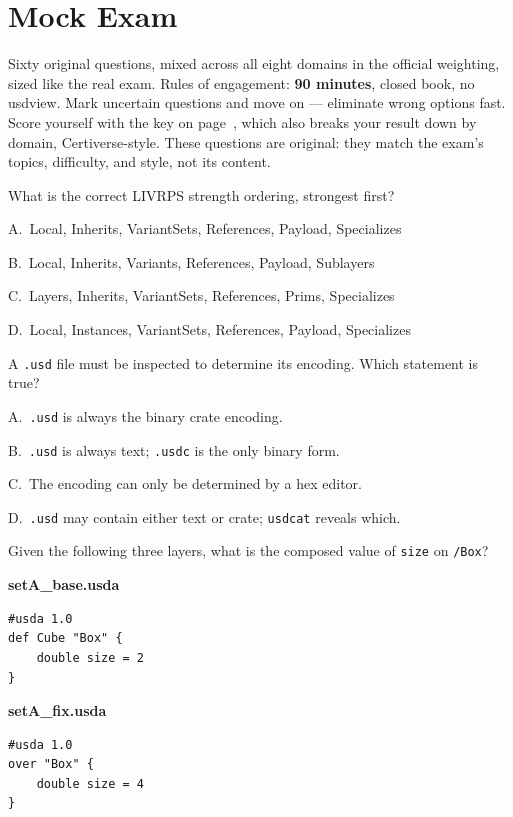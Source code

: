 \chapter{Mock Exam}
\label{ch:mock}

Sixty original questions, mixed across all eight domains in the official
weighting, sized like the real exam. Rules of engagement: \textbf{90
minutes}, closed book, no usdview. Mark uncertain questions and move on ---
eliminate wrong options fast. Score yourself with the key on
page~\pageref{ch:mockkey}, which also breaks your result down by domain,
Certiverse-style.
These questions are original: they match the exam's topics, difficulty, and
style, not its content.

What is the correct LIVRPS strength ordering, strongest first?
\begin{Choices}
  \item A.\ Local, Inherits, VariantSets, References, Payload, Specializes
  \item B.\ Local, Inherits, Variants, References, Payload, Sublayers
  \item C.\ Layers, Inherits, VariantSets, References, Prims, Specializes
  \item D.\ Local, Instances, VariantSets, References, Payload, Specializes
\end{Choices}

A \texttt{.usd} file must be inspected to determine its encoding. Which
statement is true?
\begin{Choices}
  \item A.\ \texttt{.usd} is always the binary crate encoding.
  \item B.\ \texttt{.usd} is always text; \texttt{.usdc} is the only binary form.
  \item C.\ The encoding can only be determined by a hex editor.
  \item D.\ \texttt{.usd} may contain either text or crate; \texttt{usdcat} reveals which.
\end{Choices}

Given the following three layers, what is the composed value of
\texttt{size} on \texttt{/Box}?

\noindent\textbf{setA\_base.usda}
\begin{lstlisting}
#usda 1.0
def Cube "Box" {
    double size = 2
}
\end{lstlisting}

\noindent\textbf{setA\_fix.usda}
\begin{lstlisting}
#usda 1.0
over "Box" {
    double size = 4
}
\end{lstlisting}

